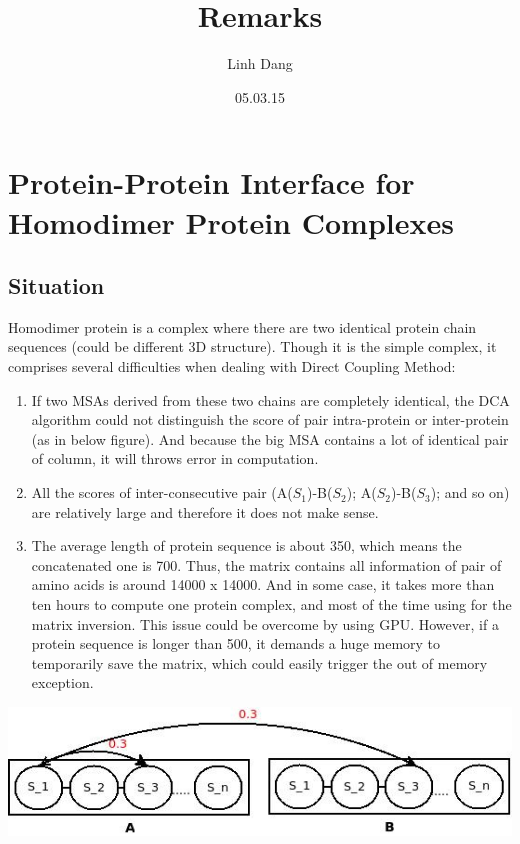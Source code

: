 \documentclass[a4paper,12pt]{article}
\begin{document}
\title{Remarks}
\author{Linh Dang}
\date{05.03.15} 
\maketitle

\section*{Protein-Protein Interface for Homodimer Protein Complexes}
\subsection*{Situation}
Homodimer protein is a complex where there are two identical protein chain sequences (could be different 3D structure). Though it is the simple complex, it comprises several difficulties when dealing with Direct Coupling Method:
\begin{enumerate}
\item
If two MSAs derived from these two chains are completely identical, the DCA algorithm could not distinguish the score of pair intra-protein or inter-protein (as in below figure). And because the big MSA contains a lot of identical pair of column, it will throws error in computation.
\item
All the scores of inter-consecutive pair (A($ S_1 $)-B($ S_2 $); A($ S_2 $)-B($ S_3 $); and so on) are relatively large and therefore it does not make sense.
\item
The average length of protein sequence is about 350, which means the concatenated one is 700. Thus, the matrix contains all information of pair of amino acids is around 14000 x 14000. And in some case, it takes more than ten hours to compute one protein complex, and most of the time using for the matrix inversion. This issue could be overcome by using GPU. However, if a protein sequence is longer than 500, it demands a huge memory to temporarily save the matrix, which could easily trigger the out of memory exception. 

\end{enumerate}
\includegraphics[width=\textwidth]{HomologousProteinComplex.jpeg}
\end{document}
